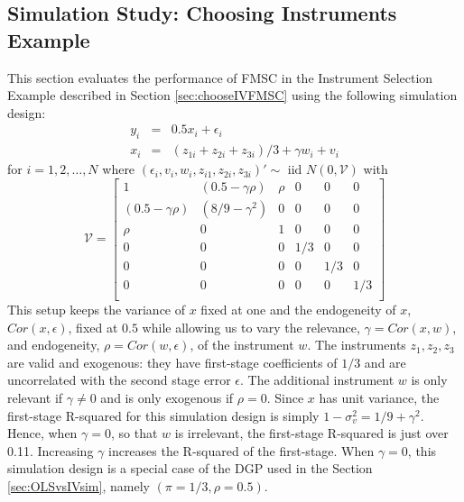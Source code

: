 \subsection{Simulation Study: Choosing Instruments Example}\label{sec:chooseIVsim}
This section evaluates the performance of FMSC in the Instrument Selection Example described in Section \ref{sec:chooseIVFMSC} using the following simulation design:
\begin{eqnarray}
		y_i &=& 0.5 x_i + \epsilon_i\\ 
		\label{eq:chooseIVDGP1}
		x_i &=& (z_{1i} + z_{2i} + z_{3i}) /3 + \gamma w_i + v_i 
		\label{eq:chooseIVDGP2}
	\end{eqnarray}
for $i=1, 2, \hdots, N$ where $(\epsilon_i, v_i, w_i, z_{i1}, z_{2i}, z_{3i})' \sim \mbox{ iid  } N(0,\mathcal{V})$ with	
\begin{equation}
			\mathcal{V} = \left[  
				\begin{array}{cccccc}
				1 & (0.5 - \gamma \rho) & \rho & 0 & 0 & 0\\
				(0.5 - \gamma \rho) & (8/9 - \gamma^2) & 0 & 0 & 0 & 0 \\
				\rho & 0 & 1 & 0 & 0 & 0\\
				0 & 0 & 0 & 1/3 & 0 & 0\\
				0 & 0 & 0 & 0 & 1/3 & 0\\
				0 & 0 & 0 & 0 & 0 & 1/3\\
				\end{array}
		\right]
		\label{eq:chooseIVDGP3}
\end{equation}
This setup keeps the variance of $x$ fixed at one and the endogeneity of $x$, $Cor(x, \epsilon)$, fixed at $0.5$ while allowing us to vary the relevance, $\gamma = Cor(x,w)$, and endogeneity, $\rho = Cor(w, \epsilon)$, of the instrument $w$.
The instruments $z_1, z_2, z_3$ are valid and exogenous: they have first-stage coefficients of $1/3$ and are uncorrelated with the second stage error $\epsilon$.
The additional instrument $w$ is only relevant if $\gamma \neq 0$ and is only exogenous if $\rho = 0$.
Since $x$ has unit variance, the first-stage R-squared for this simulation design is simply $1 - \sigma_v^2 = 1/9 + \gamma^2$.
Hence, when  $\gamma = 0$, so that $w$ is irrelevant, the first-stage R-squared is just over 0.11.
Increasing $\gamma$ increases the R-squared of the first-stage.
When $\gamma = 0$, this simulation design is a special case of the DGP used in the Section \ref{sec:OLSvsIVsim}, namely $(\pi=1/3, \rho = 0.5)$.

